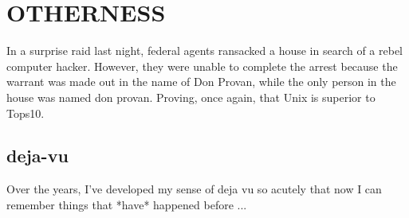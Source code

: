\chapter{\texorpdfstring{OTHERNESS}{}} %
\setcounter{equation}{0} 

In a surprise raid last night, federal agents ransacked a house in search
of a rebel computer hacker.  However, they were unable to complete the arrest
because the warrant was made out in the name of Don Provan, while the only
person in the house was named don provan.  Proving, once again, that Unix is
superior to Tops10.

\section{deja-vu}

Over the years, I've developed my sense of deja vu so acutely that now
I can remember things that *have* happened before ...



